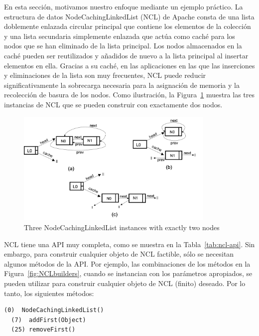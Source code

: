 En esta sección, motivamos nuestro enfoque mediante un ejemplo práctico. La estructura de datos NodeCachingLinkedList (NCL) de Apache \cite{apache} consta de una lista doblemente enlazada circular principal que contiene los elementos de la colección y una lista secundaria simplemente enlazada que actúa como caché para los nodos que se han eliminado de la lista principal. Los nodos almacenados en la caché pueden ser reutilizados y añadidos de nuevo a la lista principal al insertar elementos en ella. Gracias a su caché, en las aplicaciones en las que las inserciones y eliminaciones de la lista son muy frecuentes, NCL puede reducir significativamente la sobrecarga necesaria para la asignación de memoria y la recolección de basura de los nodos. 
Como ilustración, la Figura~\ref{fig:ncl-instances} muestra las tres instancias de NCL que se pueden construir con exactamente dos nodos.
\\

\begin{figure}[H]
    \centering
    \includegraphics[width=0.85\textwidth]{NCL-instances.png}
    \caption{Three NodeCachingLinkedList instances with exactly two nodes}
    \label{fig:ncl-instances}
\end{figure}


NCL tiene una API muy completa, como se muestra en la Tabla~\ref{tab:ncl-api}. Sin embargo, para construir cualquier objeto de NCL factible, sólo se necesitan algunos métodos de la API. Por ejemplo, las combinaciones de los métodos en la Figura~\ref{fig:NCLbuilders}, cuando se instancian con los parámetros apropiados, se pueden utilizar para construir cualquier objeto de NCL (finito) deseado. Por lo tanto, los siguientes métodos:
\\
\begin{lstlisting}[numbers=none,label=fig:NCLbuilders, caption=Conjunto de metodos sufiente para NCL]
  (0)  NodeCachingLinkedList()
  (7)  addFirst(Object)
  (25) removeFirst()
\end{lstlisting}

